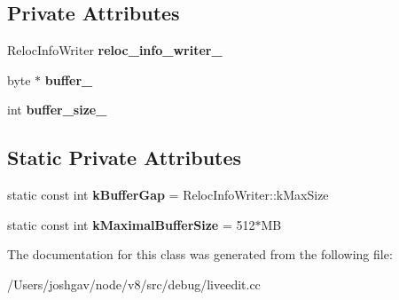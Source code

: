 \subsection*{Private Attributes}
\begin{DoxyCompactItemize}
\item 
Reloc\+Info\+Writer {\bfseries reloc\+\_\+info\+\_\+writer\+\_\+}\hypertarget{classv8_1_1internal_1_1_reloc_info_buffer_a21cd77affe477c88df2aac61365ddd44}{}\label{classv8_1_1internal_1_1_reloc_info_buffer_a21cd77affe477c88df2aac61365ddd44}

\item 
byte $\ast$ {\bfseries buffer\+\_\+}\hypertarget{classv8_1_1internal_1_1_reloc_info_buffer_abc33d16bd01fc207d18497b4800d7529}{}\label{classv8_1_1internal_1_1_reloc_info_buffer_abc33d16bd01fc207d18497b4800d7529}

\item 
int {\bfseries buffer\+\_\+size\+\_\+}\hypertarget{classv8_1_1internal_1_1_reloc_info_buffer_a68a9c8b3c1892c91158f6b95e7b0d7a1}{}\label{classv8_1_1internal_1_1_reloc_info_buffer_a68a9c8b3c1892c91158f6b95e7b0d7a1}

\end{DoxyCompactItemize}
\subsection*{Static Private Attributes}
\begin{DoxyCompactItemize}
\item 
static const int {\bfseries k\+Buffer\+Gap} = Reloc\+Info\+Writer\+::k\+Max\+Size\hypertarget{classv8_1_1internal_1_1_reloc_info_buffer_ad90362fba78b9ddf88833468d9fe0339}{}\label{classv8_1_1internal_1_1_reloc_info_buffer_ad90362fba78b9ddf88833468d9fe0339}

\item 
static const int {\bfseries k\+Maximal\+Buffer\+Size} = 512$\ast$MB\hypertarget{classv8_1_1internal_1_1_reloc_info_buffer_abb8875f6eeec47692e61989d4f2c0f32}{}\label{classv8_1_1internal_1_1_reloc_info_buffer_abb8875f6eeec47692e61989d4f2c0f32}

\end{DoxyCompactItemize}


The documentation for this class was generated from the following file\+:\begin{DoxyCompactItemize}
\item 
/\+Users/joshgav/node/v8/src/debug/liveedit.\+cc\end{DoxyCompactItemize}
